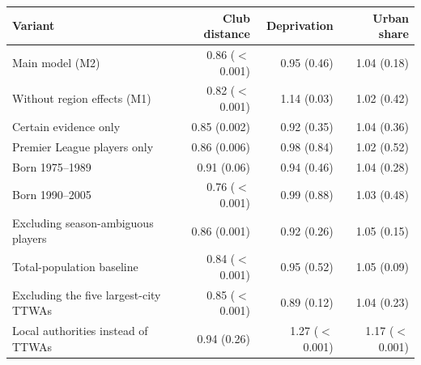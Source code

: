 \begin{tabular}{lrrr}
\toprule
Variant & Club distance & Deprivation & Urban share
\\
\midrule
Main model (M2) & 0.86 ($<$0.001) & 0.95 (0.46) & 1.04 (0.18) \\
Without region effects (M1) & 0.82 ($<$0.001) & 1.14 (0.03) & 1.02 (0.42) \\
Certain evidence only & 0.85 (0.002) & 0.92 (0.35) & 1.04 (0.36) \\
Premier League players only & 0.86 (0.006) & 0.98 (0.84) & 1.02 (0.52) \\
Born 1975--1989 & 0.91 (0.06) & 0.94 (0.46) & 1.04 (0.28) \\
Born 1990--2005 & 0.76 ($<$0.001) & 0.99 (0.88) & 1.03 (0.48) \\
Excluding season-ambiguous players & 0.86 (0.001) & 0.92 (0.26) & 1.05 (0.15) \\
Total-population baseline & 0.84 ($<$0.001) & 0.95 (0.52) & 1.05 (0.09) \\
Excluding the five largest-city TTWAs & 0.85 ($<$0.001) & 0.89 (0.12) & 1.04 (0.23) \\
Local authorities instead of TTWAs & 0.94 (0.26) & 1.27 ($<$0.001) & 1.17 ($<$0.001) \\
\bottomrule
\end{tabular}
